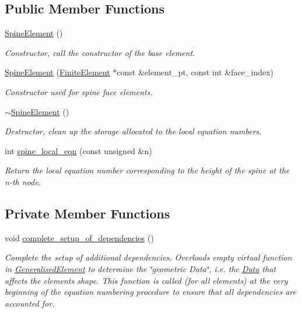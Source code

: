 \subsection*{Public Member Functions}
\begin{DoxyCompactItemize}
\item 
\hyperlink{classoomph_1_1SpineElement_ab8d0c3d5ff2a820c76a9eaef12d1b71c}{Spine\+Element} ()
\begin{DoxyCompactList}\small\item\em Constructor, call the constructor of the base element. \end{DoxyCompactList}\item 
\hyperlink{classoomph_1_1SpineElement_aaf749916e9365affb7bed85dcc129e74}{Spine\+Element} (\hyperlink{classoomph_1_1FiniteElement}{Finite\+Element} $\ast$const \&element\+\_\+pt, const int \&face\+\_\+index)
\begin{DoxyCompactList}\small\item\em Constructor used for spine face elements. \end{DoxyCompactList}\item 
\hyperlink{classoomph_1_1SpineElement_a54acf4222f3807c53075beedd25ed824}{$\sim$\+Spine\+Element} ()
\begin{DoxyCompactList}\small\item\em Destructor, clean up the storage allocated to the local equation numbers. \end{DoxyCompactList}\item 
int \hyperlink{classoomph_1_1SpineElement_aaee520873e49100368ac2362e3d16324}{spine\+\_\+local\+\_\+eqn} (const unsigned \&n)
\begin{DoxyCompactList}\small\item\em Return the local equation number corresponding to the height of the spine at the n-\/th node. \end{DoxyCompactList}\end{DoxyCompactItemize}
\subsection*{Private Member Functions}
\begin{DoxyCompactItemize}
\item 
void \hyperlink{classoomph_1_1SpineElement_a867b5e4eb64d60da9585f8a791fbac36}{complete\+\_\+setup\+\_\+of\+\_\+dependencies} ()
\begin{DoxyCompactList}\small\item\em Complete the setup of additional dependencies. Overloads empty virtual function in \hyperlink{classoomph_1_1GeneralisedElement}{Generalised\+Element} to determine the \char`\"{}geometric 
\+Data\char`\"{}, i.\+e. the \hyperlink{classoomph_1_1Data}{Data} that affects the element\textquotesingle{}s shape. This function is called (for all elements) at the very beginning of the equation numbering procedure to ensure that all dependencies are accounted for. \end{DoxyCompactList}\end{DoxyCompactItemize}
